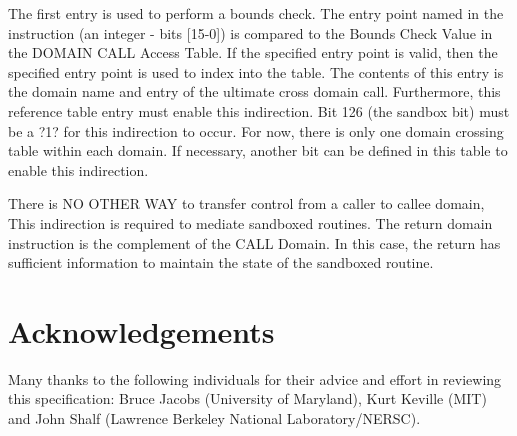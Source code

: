 \documentclass{article}
\begin{document}
\begin{appendices}
The first entry is used to perform a bounds check.  The entry point named  in the instruction (an integer - bits [15-0]) is compared to the Bounds Check  Value in  the DOMAIN CALL Access Table.  If  the specified entry point is valid,  then   the specified entry  point is used to index into the table. The contents of this entry is the domain name and entry of the ultimate cross domain call. Furthermore, this reference table entry must enable this  indirection.  Bit 126 (the sandbox  bit)  must be a ?1? for this indirection to occur.  For now, there is only one domain crossing table within each domain.  If necessary,  another bit can be defined in this table to  enable  this indirection.

There is NO OTHER WAY to transfer control from a caller to callee domain,  This indirection is required to mediate sandboxed routines. The return domain instruction is the complement of the CALL Domain.  In this case,  the return has sufficient information to maintain the state of the sandboxed routine.





	






\newpage
\section*{Acknowledgements}
\label{Acknowledgements}

Many thanks to the following individuals for their advice and 
effort in reviewing this specification: Bruce Jacobs (University 
of Maryland), Kurt Keville (MIT) and John Shalf (Lawrence Berkeley 
National Laboratory/NERSC).

\newpage
{}



%

\end{appendices}
\end{document}
